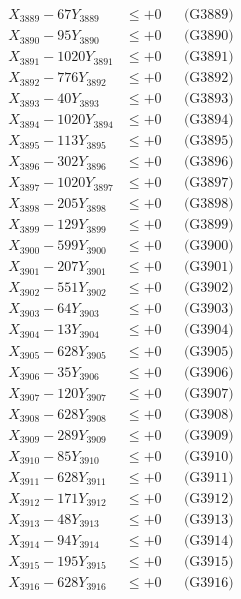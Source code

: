 \documentclass[a4paper,10pt]{article}
\begin{document}
{\begin{align}
X_{3889} - 67Y_{3889} &\leq +0 && \text{(G3889)} \\
X_{3890} - 95Y_{3890} &\leq +0 && \text{(G3890)} \\
\allowbreak
X_{3891} - 1020Y_{3891} &\leq +0 && \text{(G3891)} \\
X_{3892} - 776Y_{3892} &\leq +0 && \text{(G3892)} \\
X_{3893} - 40Y_{3893} &\leq +0 && \text{(G3893)} \\
X_{3894} - 1020Y_{3894} &\leq +0 && \text{(G3894)} \\
X_{3895} - 113Y_{3895} &\leq +0 && \text{(G3895)} \\
X_{3896} - 302Y_{3896} &\leq +0 && \text{(G3896)} \\
X_{3897} - 1020Y_{3897} &\leq +0 && \text{(G3897)} \\
X_{3898} - 205Y_{3898} &\leq +0 && \text{(G3898)} \\
X_{3899} - 129Y_{3899} &\leq +0 && \text{(G3899)} \\
X_{3900} - 599Y_{3900} &\leq +0 && \text{(G3900)} \\
\allowbreak
X_{3901} - 207Y_{3901} &\leq +0 && \text{(G3901)} \\
X_{3902} - 551Y_{3902} &\leq +0 && \text{(G3902)} \\
X_{3903} - 64Y_{3903} &\leq +0 && \text{(G3903)} \\
X_{3904} - 13Y_{3904} &\leq +0 && \text{(G3904)} \\
X_{3905} - 628Y_{3905} &\leq +0 && \text{(G3905)} \\
X_{3906} - 35Y_{3906} &\leq +0 && \text{(G3906)} \\
X_{3907} - 120Y_{3907} &\leq +0 && \text{(G3907)} \\
X_{3908} - 628Y_{3908} &\leq +0 && \text{(G3908)} \\
X_{3909} - 289Y_{3909} &\leq +0 && \text{(G3909)} \\
X_{3910} - 85Y_{3910} &\leq +0 && \text{(G3910)} \\
\allowbreak
X_{3911} - 628Y_{3911} &\leq +0 && \text{(G3911)} \\
X_{3912} - 171Y_{3912} &\leq +0 && \text{(G3912)} \\
X_{3913} - 48Y_{3913} &\leq +0 && \text{(G3913)} \\
X_{3914} - 94Y_{3914} &\leq +0 && \text{(G3914)} \\
X_{3915} - 195Y_{3915} &\leq +0 && \text{(G3915)} \\
X_{3916} - 628Y_{3916} &\leq +0 && \text{(G3916)} \\

\end{align}}
\end{document}
